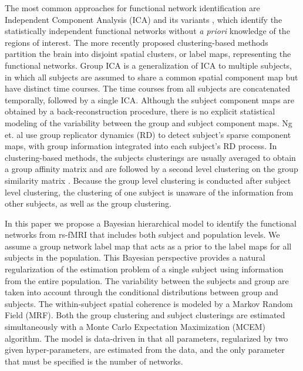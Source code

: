 \documentclass[runningheads,a4paper]{llncs}
\begin{document}
The most common approaches for functional network identification are Independent
Component Analysis (ICA) and its variants
\cite{calhoun2001spatial}, which identify the
statistically independent functional networks without \emph{a priori} knowledge
of the regions of interest. The more recently proposed clustering-based methods
\cite{bellec2010multi,van2008normalized} partition the brain into disjoint
spatial clusters, or label maps, representing the functional networks. Group ICA
\cite{calhoun2001spatial} is a generalization of ICA to multiple subjects, in
which all subjects are assumed to share a common spatial component map but have
distinct time courses. The time courses from all subjects are concatenated
temporally, followed by a single ICA. Although the subject component maps are
obtained by a back-reconstruction procedure, there is no explicit statistical
modeling of the variability between the group and subject component maps.  Ng
et. al \cite{nggroup2012} use group replicator dynamics (RD) to detect subject's
sparse component maps, with group information integrated into each subject's RD
process. In clustering-based methods, the subjects clusterings are usually
averaged to obtain a group affinity matrix and are followed by a second level
clustering on the group similarity matrix
\cite{bellec2010multi,van2008normalized}. Because the group level clustering is
conducted after subject level clustering, the clustering of one subject is
unaware of the information from other subjects, as well as the group clustering.

In this paper we propose a Bayesian hierarchical model to identify the
functional networks from rs-fMRI that includes both subject and population
levels. We assume a group network label map that acts as a prior to the label
maps for all subjects in the population. This Bayesian perspective provides a
natural regularization of the estimation problem of a single subject using
information from the entire population. The variability between the subjects and
group are taken into account through the conditional distributions between group
and subjects. The within-subject spatial coherence is modeled by a Markov Random
Field (MRF). Both the group clustering and subject clusterings are estimated
simultaneously with a Monte Carlo Expectation Maximization (MCEM) algorithm. The
model is data-driven in that all parameters, regularized by two given
hyper-parameters, are estimated from the data, and the only parameter that must
be specified is the number of networks.
\end{document}
